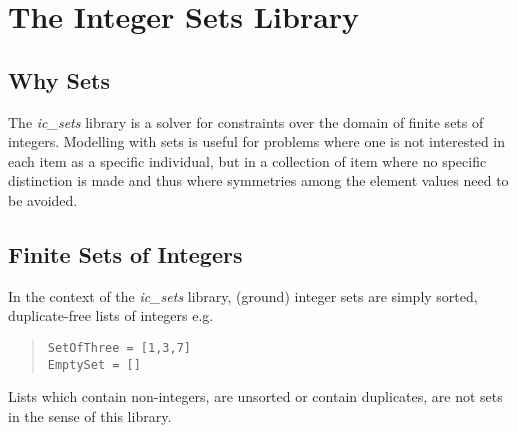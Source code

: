 %
% 
% 
% 
% 

\chapter{The Integer Sets Library}
\label{icsets}


\section{Why Sets}

The {\em ic_sets} library is a solver for constraints over the domain
of finite sets of integers.
Modelling with sets is useful for problems where one is not
interested in each item as a specific individual, but in a
collection of item where no specific distinction is made and thus
where symmetries among the element values need to be avoided.


\section{Finite Sets of Integers}

In the context of the {\em ic_sets} library, (ground) integer sets are
simply sorted, duplicate-free lists of integers e.g.
\begin{quote}\begin{verbatim}
SetOfThree = [1,3,7]
EmptySet = []
\end{verbatim}\end{quote}
Lists which contain non-integers, are unsorted or contain duplicates,
are not sets in the sense of this library.


